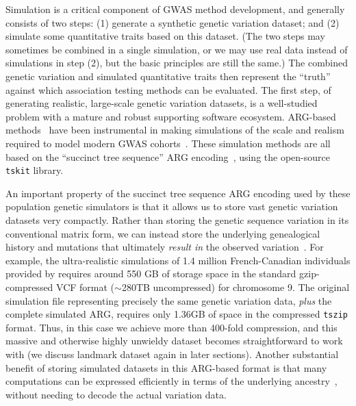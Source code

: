 \documentclass[unnumsec,webpdf,modern,large,namedate]{oup-authoring-template}%
\begin{document}
Simulation is a critical component of GWAS method development, and
generally consists of two steps: (1) generate a synthetic genetic
variation dataset; and (2) simulate some quantitative traits
based on this dataset.
(The two steps may sometimes be combined
in a single simulation, or we may use real data instead of simulations in
step (2), but the basic principles are still the same.)
The combined genetic variation and
simulated quantitative traits then represent the ``truth'' against
which association testing methods can be evaluated.
The first step, of generating realistic, large-scale genetic variation
datasets, is a well-studied problem with a mature and robust supporting
software ecosystem. ARG-based methods~\citep{kelleher2016efficient,
kelleher2018efficient,haller2018tree,baumdicker2022efficient,anderson2023}
have been instrumental in making simulations of the scale and realism
required to model modern GWAS cohorts~\cite[e.g.][]{martin2017,zaidi2020}.
These simulation methods are all based on the ``succinct tree
sequence'' ARG encoding~\citep{kelleher2019,ralph2020,wong2023general},
using the open-source \texttt{tskit} library.

An important property of the succinct tree sequence ARG encoding
used by these population genetic simulators is that it allows us to
store vast genetic variation datasets very compactly. Rather than
storing the genetic sequence variation in its conventional matrix
form, we can instead store the underlying genealogical history
and mutations that ultimately \emph{result in} the observed
variation~\citep{kelleher2019}.
For example, the ultra-realistic simulations of 1.4 million
French-Canadian individuals provided by \citet{anderson2023}
requires around 550 GB of storage space in the
standard gzip-compressed VCF format ($\sim$280TB uncompressed)
for chromosome 9. The original simulation file representing
precisely the same genetic variation data, \emph{plus} the
complete simulated ARG, requires only 1.36GB of space
in the compressed \texttt{tszip} format. Thus, in this
case we achieve more than 400-fold compression,
and this massive and otherwise highly unwieldy dataset
becomes straightforward to work with (we discuss
landmark dataset again in later sections).
Another substantial benefit of storing simulated datasets
in this ARG-based format is that many computations can
be expressed efficiently in terms of the underlying
ancestry~\citep{kelleher2016efficient,ralph2020}, without
needing to decode the actual variation data.
\end{document}
